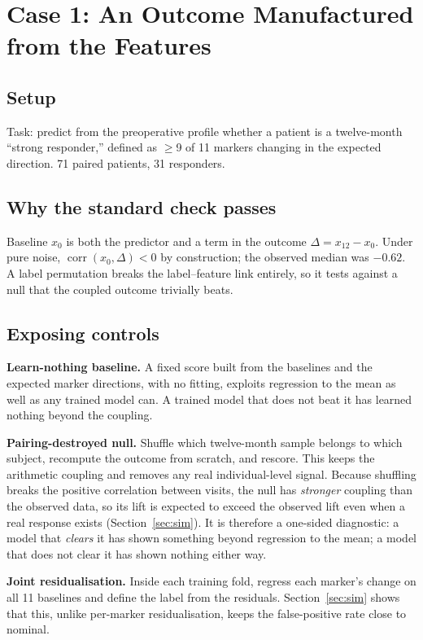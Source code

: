 \documentclass[conference]{IEEEtran}
\newcommand{\verified}[1]{#1}  %
\begin{document}
\section{Case 1: An Outcome Manufactured from the Features}
\label{sec:case1}

\subsection{Setup}
Task: predict from the preoperative profile whether a patient is a
twelve-month ``strong responder,'' defined as $\geq$9 of 11 markers changing
in the expected direction. 71 paired patients, 31 responders.

\subsection{Why the standard check passes}
Baseline $x_0$ is both the predictor and a term in the outcome
$\Delta = x_{12} - x_0$. Under pure noise, $\operatorname{corr}(x_0, \Delta)<0$
by construction; the observed median was \verified{$-0.62$}. A label
permutation breaks the label--feature link entirely, so it tests against a
null that the coupled outcome trivially beats.

\subsection{Exposing controls}
\textbf{Learn-nothing baseline.} A fixed score built from the baselines and
the expected marker directions, with no fitting, exploits regression to the
mean as well as any trained model can. A trained model that does not beat it
has learned nothing beyond the coupling.

\textbf{Pairing-destroyed null.} Shuffle which twelve-month sample belongs
to which subject, recompute the outcome from scratch, and rescore. This keeps
the arithmetic coupling and removes any real individual-level signal. Because
shuffling breaks the positive correlation between visits, the null has
\emph{stronger} coupling than the observed data, so its lift is expected to
exceed the observed lift even when a real response exists
(Section~\ref{sec:sim}). It is therefore a one-sided diagnostic: a model that
\emph{clears} it has shown something beyond regression to the mean; a model
that does not clear it has shown nothing either way.

\textbf{Joint residualisation.} Inside each training fold, regress each
marker's change on all 11 baselines and define the label from the residuals.
Section~\ref{sec:sim} shows that this, unlike per-marker residualisation,
keeps the false-positive rate close to nominal.
\end{document}

